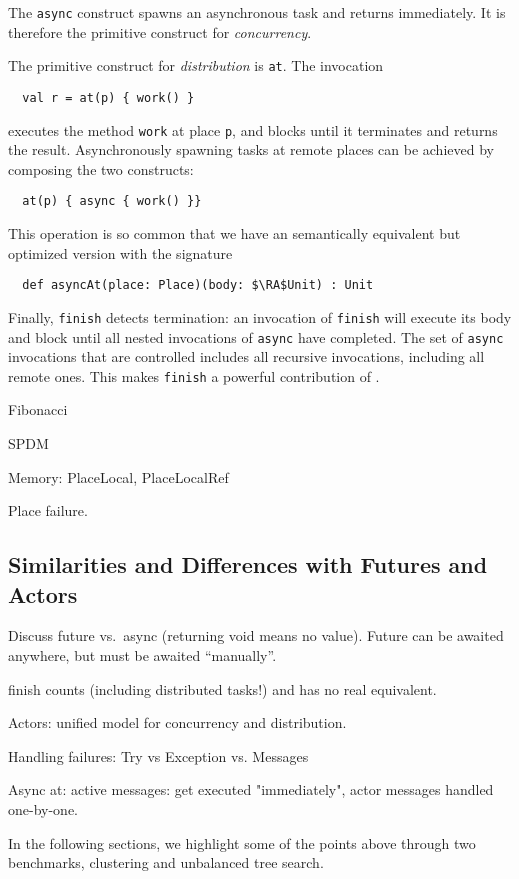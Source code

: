 The \lstinline{async} construct spawns an asynchronous task and returns
immediately. It is therefore the primitive construct for \emph{concurrency}.

The primitive construct for \emph{distribution} is \lstinline{at}. The invocation
\begin{lstlisting}
  val r = at(p) { work() }
\end{lstlisting}
executes the method \lstinline{work} at place \lstinline{p}, and blocks until
it terminates and returns the result. Asynchronously spawning tasks at remote places can be achieved by composing the two constructs:
\begin{lstlisting}
  at(p) { async { work() }}
\end{lstlisting}
This operation is so common that we have an semantically equivalent but optimized version with the signature
\begin{lstlisting}
  def asyncAt(place: Place)(body: $\RA$Unit) : Unit
\end{lstlisting}

Finally, \lstinline{finish} detects termination: an invocation of
\lstinline{finish} will execute its body and block until all nested invocations
of \lstinline{async} have completed. The set of \lstinline{async} invocations
that are controlled includes all recursive invocations, including all remote
ones. This makes \lstinline{finish} a powerful contribution of \apgas.

Fibonacci

SPDM

Memory: PlaceLocal, PlaceLocalRef

Place failure.

\subsection{Similarities and Differences with Futures and Actors}

Discuss future vs.\ async (returning void means no value). Future can be awaited anywhere, but must be awaited ``manually''.

finish counts (including distributed tasks!) and has no real equivalent.

Actors: unified model for concurrency and distribution.

Handling failures: Try vs Exception vs. Messages

Async at: active messages: get executed "immediately", actor messages handled one-by-one.

In the following sections, we highlight some of the points above through two
benchmarks, \kmeans clustering and unbalanced tree search.


% 
